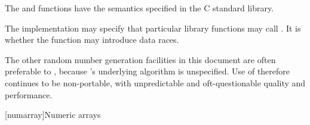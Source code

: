 \begin{itemdescr}
\pnum
\effects
The
 and 
functions have the semantics specified in the C standard library.

\pnum
\remarks
The implementation
may specify that particular library functions may call
.
It is 
whether the  function
may introduce data races.
\begin{note}
%
The other random
number generation facilities in this document are often preferable
to , because 's underlying algorithm is unspecified.
Use of  therefore continues to be non-portable, with unpredictable
and oft-questionable quality and performance.
\end{note}
\end{itemdescr}




[numarray]{Numeric arrays}

